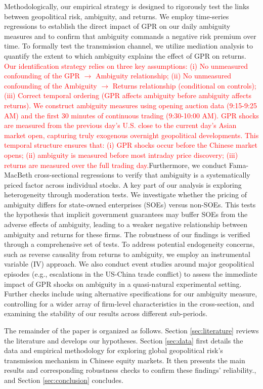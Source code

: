 \documentclass[preprint,12pt,authoryear]{elsarticle}
\begin{document}
Methodologically, our empirical strategy is designed to rigorously test the links between geopolitical risk, ambiguity, and returns. We employ time-series regressions to establish the direct impact of GPR on our daily ambiguity measures and to confirm that ambiguity commands a negative risk premium over time. To formally test the transmission channel, we utilize mediation analysis to quantify the extent to which ambiguity explains the effect of GPR on returns. \textcolor{red}{Our identification strategy relies on three key assumptions: (i) No unmeasured confounding of the GPR $\rightarrow$ Ambiguity relationship; (ii) No unmeasured confounding of the Ambiguity $\rightarrow$ Returns relationship (conditional on controls); (iii) Correct temporal ordering (GPR affects ambiguity before ambiguity affects returns). We construct ambiguity measures using opening auction data (9:15-9:25 AM) and the first 30 minutes of continuous trading (9:30-10:00 AM). GPR shocks are measured from the previous day's U.S. close to the current day's Asian market open, capturing truly exogenous overnight geopolitical developments. This temporal structure ensures that: (i) GPR shocks occur before the Chinese market opens; (ii) ambiguity is measured before most intraday price discovery; (iii) returns are measured over the full trading day.}Furthermore, we conduct Fama-MacBeth cross-sectional regressions to verify that ambiguity is a systematically priced factor across individual stocks. A key part of our analysis is exploring heterogeneity through moderation tests. We investigate whether the pricing of ambiguity differs for state-owned enterprises (SOEs) versus non-SOEs. This tests the hypothesis that implicit government guarantees may buffer SOEs from the adverse effects of ambiguity, leading to a weaker negative relationship between ambiguity and returns for these firms. The robustness of our findings is verified through a comprehensive set of tests. To address potential endogeneity concerns, such as reverse causality from returns to ambiguity, we employ an instrumental variable (IV) approach. We also conduct event studies around major geopolitical episodes (e.g., escalations in the US-China trade conflict) to assess the immediate impact of GPR shocks on ambiguity in a quasi-natural experimental setting. Further checks include using alternative specifications for our ambiguity measure, controlling for a wider array of firm-level characteristics in the cross-section, and examining the stability of our results across different sub-periods.

The remainder of the paper is organized as follows. Section \ref{sec:literature} reviews the literature and develops our hypotheses. Section \ref{sec:data} first details the data and empirical methodology for exploring global geopolitical risk's transmission mechanism in Chinese equity markets. It then presents the main results and corresponding robustness checks to confirm these findings' reliability., and Section \ref{sec:conclusion} concludes.
\end{document}
